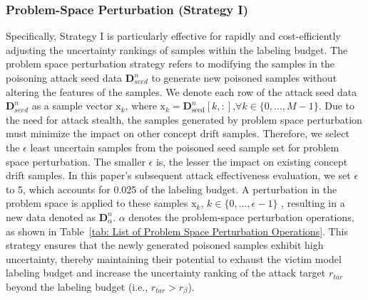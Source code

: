 \documentclass[conference,compsoc]{IEEEtran} %
\begin{document}
\subsubsection{Problem-Space Perturbation (Strategy I)}
\label{Sec: Strategy I-Problem-Space Perturbation}

Specifically, Strategy I is particularly effective for rapidly and cost-efficiently adjusting the uncertainty rankings of samples within the labeling budget.
The problem space perturbation strategy refers to modifying the samples in the poisoning attack seed data $\bm{D}_{seed}^{n}$ to generate new poisoned samples without altering the features of the samples.
We denote each row of the attack seed data $\bm{D}_{seed}^{n}$ as a sample vector $\bm{\mathrm{x}}_{k}$, where $\bm{\mathrm{x}}_{k} = \bm{D}_{\text{seed}}^{n}[k,:]$,$\forall k \in \{0, \dots, M-1 \}$.
Due to the need for attack stealth, the samples generated by problem space perturbation must minimize the impact on other concept drift samples. 
Therefore, we select the $\epsilon$ least uncertain samples from the poisoned seed sample set for problem space perturbation. 
The smaller $\epsilon$ is, the lesser the impact on existing concept drift samples.
In this paper's subsequent attack effectiveness evaluation, we set $\epsilon$ to 5, which accounts for 0.025 of the labeling budget.
A perturbation in the problem space is applied to these samples $\bm{\mathrm{x}}_{k}$, $k \in \{0, \dots,  \epsilon-1 \}$ , resulting in a new data denoted as $\bm{D}_{\alpha}^{n}$.
$\alpha$ denotes the problem-space perturbation operations, as shown in Table~\ref{tab: List of Problem Space Perturbation Operations}.
This strategy ensures that the newly generated poisoned samples exhibit high uncertainty, thereby maintaining their potential to exhaust the victim model  labeling budget and increase the uncertainty ranking of the attack target $r_{tar}$ beyond the labeling budget (i.e., $r_{tar} > r_{\beta}$).
\end{document}

